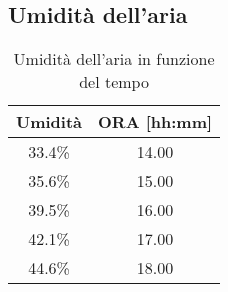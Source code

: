\begin{appendices}
\section{Umidità dell'aria}

\begin{table}[H]
	\centering
	\begin{tabular}{|c|c|} \hline
		\textbf{Umidità} & \textbf{ORA {[hh:mm]} }  \\ \hline
		33.4\% & 14.00  \\ \hline
		35.6\% & 15.00  \\ \hline
		39.5\% & 16.00  \\ \hline
		42.1\% & 17.00  \\ \hline
		44.6\% & 18.00  \\ \hline
	\end{tabular}
	\caption{Umidità dell'aria in funzione del tempo}
\end{table}
\end{appendices}

